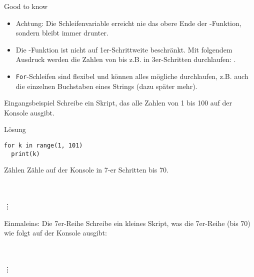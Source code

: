 \begin{frame}
\begin{block}{Good to know}
	\pause
	\begin{itemize}[<+->]
		\item Achtung: Die Schleifenvariable erreicht nie das obere Ende der -Funktion, sondern bleibt immer  drunter. 
		\item Die -Funktion ist nicht auf 1er-Schrittweite beschränkt. Mit folgendem Ausdruck werden die Zahlen von  bis  z.B. in 3er-Schritten durchlaufen: . 
		\item \texttt{For}-Schleifen sind flexibel und können alles mögliche durchlaufen, z.B. auch die einzelnen Buchstaben eines Strings (dazu später mehr).
	\end{itemize}
\end{block}
\end{frame}


\begin{fragile}
	
\begin{block}{Eingangsbeispiel}
\vspace{2pt}
Schreibe ein Skript, das alle Zahlen von 1 bis 100 auf der Konsole ausgibt. 

\vspace{12pt}
\begin{solutionblock}{Lösung}
\begin{verbatim}
for k in range(1, 101)
  print(k)
\end{verbatim}
\end{solutionblock}
\end{block}
\end{fragile}



\begin{fragile}[Übungen]

\begin{block}{Zählen}
\vspace{2pt}
Zähle auf der Konsole in 7-er Schritten bis 70.

 \\
 \\
\phantom{|} \vdots\\
\end{block}


\pause 

\vspace{12pt}

\begin{block}{Einmaleins: Die 7er-Reihe}
	\vspace{2pt}
	Schreibe ein kleines Skript, was die 7er-Reihe (bis 70) wie folgt auf der Konsole ausgibt: 
	
	\\	
	\\
	\phantom{4 mal} \vdots  
\end{block}
\end{fragile}


